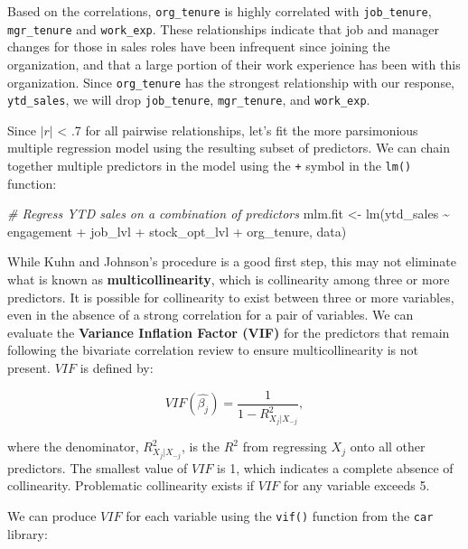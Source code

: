 \documentclass[
]{book}
\newenvironment{Shaded}{\begin{snugshade}}{\end{snugshade}}
\newcommand{\CommentTok}[1]{\textcolor[rgb]{0.56,0.35,0.01}{\textit{#1}}}
\newcommand{\FunctionTok}[1]{\textcolor[rgb]{0.00,0.00,0.00}{#1}}
\newcommand{\NormalTok}[1]{#1}
\newcommand{\OtherTok}[1]{\textcolor[rgb]{0.56,0.35,0.01}{#1}}
\newcommand{\SpecialCharTok}[1]{\textcolor[rgb]{0.00,0.00,0.00}{#1}}
\begin{document}
Based on the correlations, \texttt{org\_tenure} is highly correlated with \texttt{job\_tenure}, \texttt{mgr\_tenure} and \texttt{work\_exp}. These relationships indicate that job and manager changes for those in sales roles have been infrequent since joining the organization, and that a large portion of their work experience has been with this organization. Since \texttt{org\_tenure} has the strongest relationship with our response, \texttt{ytd\_sales}, we will drop \texttt{job\_tenure}, \texttt{mgr\_tenure}, and \texttt{work\_exp}.

Since \(|r|\) \textless{} .7 for all pairwise relationships, let's fit the more parsimonious multiple regression model using the resulting subset of predictors. We can chain together multiple predictors in the model using the \texttt{+} symbol in the \texttt{lm()} function:

\begin{Shaded}
\begin{Highlighting}[]
\CommentTok{\# Regress YTD sales on a combination of predictors}
\NormalTok{mlm.fit }\OtherTok{\textless{}{-}} \FunctionTok{lm}\NormalTok{(ytd\_sales }\SpecialCharTok{\textasciitilde{}}\NormalTok{ engagement }\SpecialCharTok{+}\NormalTok{ job\_lvl }\SpecialCharTok{+}\NormalTok{ stock\_opt\_lvl }\SpecialCharTok{+}\NormalTok{ org\_tenure, data)}
\end{Highlighting}
\end{Shaded}

While Kuhn and Johnson's procedure is a good first step, this may not eliminate what is known as \textbf{multicollinearity}, which is collinearity among three or more predictors. It is possible for collinearity to exist between three or more variables, even in the absence of a strong correlation for a pair of variables. We can evaluate the \textbf{Variance Inflation Factor (VIF)} for the predictors that remain following the bivariate correlation review to ensure multicollinearity is not present. \(VIF\) is defined by:

\[ VIF(\hat{\beta_j}) = \frac{1}{1 - R^2_{X_j|X_{-j}}}, \]

where the denominator, \(R^2_{X_j|X_{-j}}\), is the \(R^2\) from regressing \(X_j\) onto all other predictors. The smallest value of \(VIF\) is 1, which indicates a complete absence of collinearity. Problematic collinearity exists if \(VIF\) for any variable exceeds 5.

We can produce \(VIF\) for each variable using the \texttt{vif()} function from the \texttt{car} library:
\end{document}
